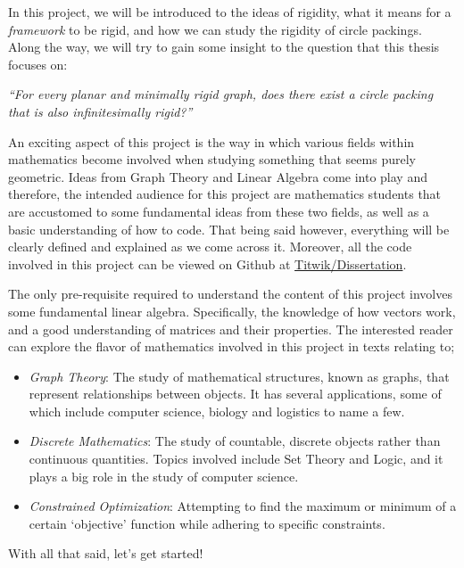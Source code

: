 \begin{flushleft}
In this project, we will be introduced to the ideas of rigidity, what it means for a \textit{framework} to be rigid, and how we can study the rigidity of circle packings. Along the way, we will try to gain some insight to the question that this thesis focuses on:

\begin{center}
    \textit{``For every planar and minimally rigid graph, does there exist a circle packing that is also infinitesimally rigid?''}
\end{center}
\end{flushleft}

\begin{flushleft}
An exciting aspect of this project is the way in which various fields within mathematics become involved when studying something that seems purely geometric. Ideas from Graph Theory and Linear Algebra come into play and therefore, the intended audience for this project are mathematics students that are accustomed to some fundamental ideas from these two fields, as well as a basic understanding of how to code. That being said however, everything will be clearly defined and explained as we come across it. Moreover, all the code involved in this project can be viewed on Github at \href{https://github.com/Titwik/Dissertation}{Titwik/Dissertation}.    
\end{flushleft}

\begin{flushleft}
The only pre-requisite required to understand the content of this project involves some fundamental linear algebra. Specifically, the knowledge of how vectors work, and a good understanding of matrices and their properties. The interested reader can explore the flavor of mathematics involved in this project in texts relating to;
\begin{itemize}
    \item \textit{Graph Theory}: The study of mathematical structures, known as graphs, that represent relationships between objects. It has several applications, some of which include computer science, biology and logistics to name a few.
    \item \textit{Discrete Mathematics}: The study of countable, discrete objects rather than continuous quantities. Topics involved include Set Theory and Logic, and it plays a big role in the study of computer science.
    \item \textit{Constrained Optimization}: Attempting to find the maximum or minimum of a certain `objective' function while adhering to specific constraints. 
\end{itemize}
\end{flushleft}

\begin{flushleft}
With all that said, let's get started!    
\end{flushleft}

